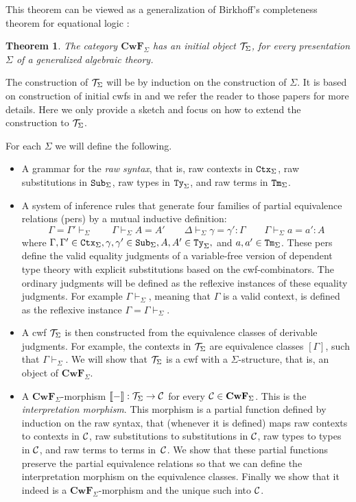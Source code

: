 \documentclass{lmcs}
\newcommand{\FYI}[1]{{\color{red}#1}}
\newtheorem{theorem}{Theorem}
\def\Cwf{\mathbf{CwF}}
\begin{document}
This theorem can be viewed as a generalization of Birkhoff's completeness theorem for equational logic \cite{birkhoff}:
\begin{theorem}\label{initial-gat}
The category $\Cwf_\Sigma$ has an initial object ${\mathcal T}_\Sigma$,
for every \FYI{presentation} $\Sigma$ of a generalized algebraic theory.
\end{theorem}

The construction of ${\mathcal T}_\Sigma$ will be by induction on the construction of $\Sigma$. It is based on construction of initial cwfs in \cite{castellan:tlca2015,castellan:lmcs} and we refer the reader to those papers for more details. Here we only provide a sketch and focus on how to extend the construction to ${\mathcal T}_\Sigma$.

For each $\Sigma$ we will define the following.
\begin{itemize}
\item
A grammar for the {\em raw syntax}, that is, raw contexts in ${\tt Ctx}_\Sigma$, raw substitutions in ${\tt Sub}_\Sigma$, raw types in ${\tt Ty}_\Sigma$, and raw terms in ${\tt Tm}_\Sigma$.
\item
A system of inference rules that generate four families of partial equivalence relations (pers) by a mutual inductive definition:
$$
\Gamma = \Gamma' \vdash_\Sigma
\qquad
\Gamma \vdash_\Sigma A = A'
\qquad
\Delta \vdash_\Sigma \gamma = \gamma' : \Gamma
\qquad
\Gamma \vdash_\Sigma a = a' : A
$$
where $\Gamma, \Gamma' \in {\tt Ctx}_\Sigma, \gamma, \gamma' \in {\tt Sub}_\Sigma, A, A' \in {\tt Ty}_\Sigma,$ and $a,a' \in {\tt Tm}_\Sigma$. These pers define the valid equality judgments of a variable-free version of dependent type theory with explicit substitutions based on the cwf-combinators. The ordinary judgments will be defined as the reflexive instances of these equality judgments. For example $\Gamma \vdash_\Sigma$, meaning that $\Gamma$ is a valid context, is defined as the reflexive instance $\Gamma = \Gamma \vdash_\Sigma$.
\item
A cwf ${\mathcal T}_\Sigma$ is then constructed from the equivalence classes of derivable judgments. For example, the contexts in ${\mathcal T}_\Sigma$ are equivalence classes $[\Gamma]$, such that $\Gamma \vdash_\Sigma$. We will show that ${\mathcal T}_\Sigma$ is a cwf with a $\Sigma$-structure, that is, an object of $\Cwf_\Sigma$.
\item
A $\Cwf_\Sigma$-morphism $\llbracket - \rrbracket : {\mathcal T}_\Sigma \to {\mathcal C}$ for every $\C \in \Cwf_\Sigma$. This is the {\em interpretation morphism}. This morphism is a partial function defined by induction on the raw syntax, that (whenever it is defined) maps raw contexts to contexts in ${\mathcal C}$, raw substitutions to substitutions in ${\mathcal C}$, raw types to types in ${\mathcal C}$, and raw terms to terms in~${\mathcal C}$. We show that these partial functions preserve the partial equivalence relations so that we can define the interpretation morphism on the equivalence classes. Finally we show that it indeed is a $\Cwf_\Sigma$-morphism and the unique such into ${\mathcal C}$.
\end{itemize}
\end{document}
